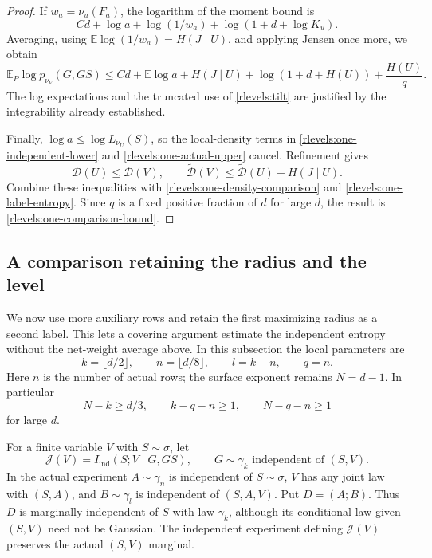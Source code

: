 \begin{proof}
If \(w_a=\nu_u(F_a)\), the logarithm of the moment bound is
\[
 Cd+\log a+\log(1/w_a)+\log(1+d+\log K_u).
\]
Averaging, using
\(\mathbb E\log(1/w_a)=H(J\mid U)\), and applying Jensen once more,
we obtain
\begin{equation}\label{rlevels:one-actual-upper}
 \mathbb E_P\log p_{\nu_V}(G,GS)
 \le Cd+\mathbb E\log a+H(J\mid U)
       +\log(1+d+H(U))+\frac{H(U)}q.
\end{equation}
The log expectations and the truncated use of
\eqref{rlevels:tilt} are justified by the integrability already
established.

Finally, \(\log a\le\log L_{\nu_U}(S)\), so the local-density terms
in \eqref{rlevels:one-independent-lower} and
\eqref{rlevels:one-actual-upper} cancel.  Refinement gives
\[
 \mathcal D(U)\le\mathcal D(V),\qquad
 \widetilde{\mathcal D}(V)
 \le\widetilde{\mathcal D}(U)+H(J\mid U).
\]
Combine these inequalities with \eqref{rlevels:one-density-comparison}
and \eqref{rlevels:one-label-entropy}.  Since \(q\) is a fixed
positive fraction of \(d\) for large \(d\), the result is
\eqref{rlevels:one-comparison-bound}.
\end{proof}

\subsection{A comparison retaining the radius and the level}
\label{rlevels:two-level}

We now use more auxiliary rows and retain the first maximizing radius
as a second label.  This lets a covering argument estimate the
independent entropy without the net-weight average above.  In this
subsection the local parameters are
\begin{equation}\label{rlevels:two-parameters}
 k=\lfloor d/2\rfloor,\qquad n=\lfloor d/8\rfloor,\qquad
 l=k-n,\qquad q=n.
\end{equation}
Here \(n\) is the number of actual rows; the surface exponent remains
\(N=d-1\).  In particular
\[
 N-k\ge d/3,\qquad k-q-n\ge1,\qquad N-q-n\ge1
\]
for large \(d\).

For a finite variable \(V\) with \(S\sim\sigma\), let
\[
 \mathcal J(V)=I_{\mathrm{ind}}(S;V\mid G,GS),
 \qquad G\sim\gamma_k
 \text{ independent of }(S,V).
\]
In the actual experiment \(A\sim\gamma_n\) is independent of
\(S\sim\sigma\), \(V\) has any joint law with \((S,A)\), and
\(B\sim\gamma_l\) is independent of \((S,A,V)\).  Put
\(D=(A;B)\).  Thus \(D\) is marginally independent of \(S\)
with law \(\gamma_k\), although its conditional law given
\((S,V)\) need not be Gaussian.  The independent experiment defining
\(\mathcal J(V)\) preserves the actual \((S,V)\) marginal.

